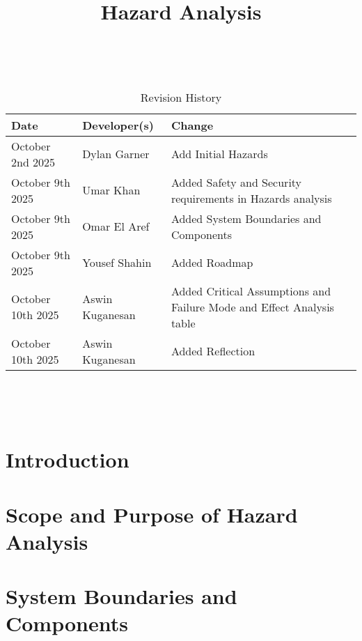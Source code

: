 \documentclass{article}
\title{Hazard Analysis\\\progname}
\author{\authname}
\date{}
\begin{document}
\maketitle
\thispagestyle{empty}

~\newpage


\begin{table}[hp]
\caption{Revision History} \label{TblRevisionHistory}
\begin{tabularx}{\textwidth}{llX}
\toprule
\textbf{Date} & \textbf{Developer(s)} & \textbf{Change}\\
\midrule
October 2nd 2025 & Dylan Garner & Add Initial Hazards\\
October 9th 2025 & Umar Khan & Added Safety and Security requirements in Hazards analysis\\
October 9th 2025 & Omar El Aref & Added System Boundaries and Components\\
October 9th 2025 & Yousef Shahin & Added Roadmap\\
October 10th 2025 & Aswin Kuganesan & Added Critical Assumptions and Failure Mode and Effect Analysis table\\
October 10th 2025 & Aswin Kuganesan & Added Reflection\\
\bottomrule
\end{tabularx}
\end{table}

~\newpage

\tableofcontents

~\newpage



\section{Introduction}


\section{Scope and Purpose of Hazard Analysis}


\section{System Boundaries and Components}
\end{document}
